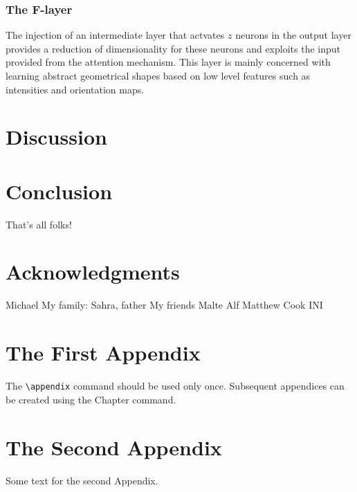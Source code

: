 \documentclass{report}
\begin{document}
\subsection{The F-layer}

The injection of an intermediate layer that actvates $z$ neurons in the output layer provides a reduction of dimensionality for these neurons and exploits the input provided from the attention mechanism. This layer is mainly concerned with learning abstract geometrical shapes based on low level features such as intensities and orientation maps. 

\chapter{Discussion}

\chapter{Conclusion}

That's all folks!

\chapter{Acknowledgments}

Michael
My family: Sahra, father
My friends Malte Alf
Matthew Cook
INI

\appendix

\chapter{The First Appendix}

The \verb"\appendix" command should be used only once. Subsequent appendices can
be created using the Chapter command.

\chapter{The Second Appendix}

Some text for the second Appendix.



\end{document}
